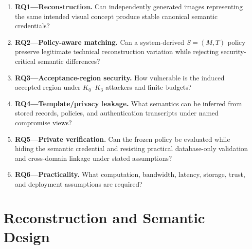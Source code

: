 \documentclass[compsoc,conference,a4paper,10pt,times]{IEEEtran}
\begin{document}
\begin{sloppypar}
\begin{enumerate}[leftmargin=*,label={}]
  \item \textbf{RQ1---Reconstruction.} Can independently generated images representing the same intended visual concept produce stable canonical semantic credentials?
  \item \textbf{RQ2---Policy-aware matching.} Can a system-derived $S=(M,T)$ policy preserve legitimate technical reconstruction variation while rejecting security-critical semantic differences?
  \item \textbf{RQ3---Acceptance-region security.} How vulnerable is the induced accepted region under $K_0$--$K_3$ attackers and finite budgets?
  \item \textbf{RQ4---Template/privacy leakage.} What semantics can be inferred from stored records, policies, and authentication transcripts under named compromise views?
  \item \textbf{RQ5---Private verification.} Can the frozen policy be evaluated while hiding the semantic credential and resisting practical database-only validation and cross-domain linkage under stated assumptions?
  \item \textbf{RQ6---Practicality.} What computation, bandwidth, latency, storage, trust, and deployment assumptions are required?
\end{enumerate}
\end{sloppypar}

\section{Reconstruction and Semantic Design}
\label{sec:design}
\end{document}
